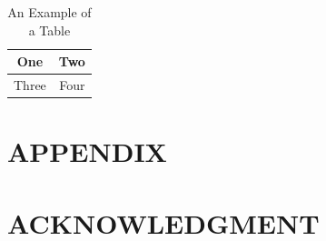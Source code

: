 \documentclass[letterpaper, 10 pt, conference]{ieeeconf}  %
\begin{document}
\begin{table}[h]
\caption{An Example of a Table}
\label{table_example}
\begin{center}
\begin{tabular}{|c||c|}
\hline
One & Two\\
\hline
Three & Four\\
\hline
\end{tabular}
\end{center}
\end{table}



   


\addtolength{\textheight}{-12cm}   %







\section*{APPENDIX}

\section*{ACKNOWLEDGMENT}








\end{document}
